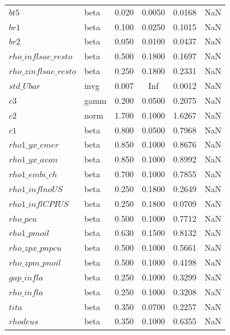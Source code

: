 \begin{center}
\begin{longtable}{llcccc}
$bt5$ & beta &   0.020 & 0.0050 &   0.0168 &     NaN \\ 
$br1$ & beta &   0.100 & 0.0250 &   0.1015 &     NaN \\ 
$br2$ & beta &   0.050 & 0.0100 &   0.0437 &     NaN \\ 
$rho\_inflsae\_resto$ & beta &   0.500 & 0.1800 &   0.1697 &     NaN \\ 
$rho\_zinflsae\_resto$ & beta &   0.250 & 0.1800 &   0.2331 &     NaN \\ 
$std\_Ubar$ & invg &   0.007 &    Inf &   0.0012 &     NaN \\ 
$c3$ & gamm &   0.200 & 0.0500 &   0.2075 &     NaN \\ 
$c2$ & norm &   1.700 & 0.1000 &   1.6267 &     NaN \\ 
$c1$ & beta &   0.800 & 0.0500 &   0.7968 &     NaN \\ 
$rho1\_yx\_emer$ & beta &   0.850 & 0.1000 &   0.8676 &     NaN \\ 
$rho1\_yx\_avan$ & beta &   0.850 & 0.1000 &   0.8992 &     NaN \\ 
$rho1\_embi\_ch$ & beta &   0.700 & 0.1000 &   0.7855 &     NaN \\ 
$rho1\_inflnoUS$ & beta &   0.250 & 0.1800 &   0.2649 &     NaN \\ 
$rho1\_inflCPIUS$ & beta &   0.250 & 0.1800 &   0.0709 &     NaN \\ 
$rho\_pcu$ & beta &   0.500 & 0.1000 &   0.7712 &     NaN \\ 
$rho1\_pmoil$ & beta &   0.630 & 0.1500 &   0.8132 &     NaN \\ 
$rho\_zpx\_pnpcu$ & beta &   0.500 & 0.1000 &   0.5661 &     NaN \\ 
$rho\_zpm\_pnoil$ & beta &   0.500 & 0.1000 &   0.4198 &     NaN \\ 
$gap\_infla$ & beta &   0.250 & 0.1000 &   0.3299 &     NaN \\ 
$rho\_infla$ & beta &   0.250 & 0.1000 &   0.3208 &     NaN \\ 
$tita$ & beta &   0.350 & 0.0700 &   0.2257 &     NaN \\ 
$rhodeus$ & beta &   0.350 & 0.1000 &   0.6355 &     NaN \\ 
\end{longtable}
 \end{center}
